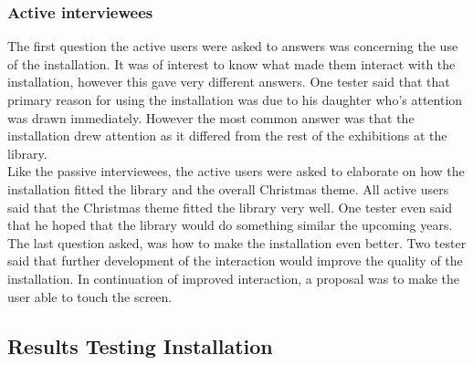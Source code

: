 
\subsubsection{Active interviewees}
The first question the active users were asked to answers was concerning the use of the installation. It was of interest to know what made them interact with the installation, however this gave very different answers. One tester said that that primary reason for using the installation was due to his daughter who's attention was drawn immediately. However the most common answer was that the installation drew attention as it differed from the rest of the exhibitions at the library.\\
Like the passive interviewees, the active users were asked to elaborate on how the installation fitted the library and the overall Christmas theme. All active users said that the Christmas theme fitted the library very well. One tester even said that he hoped that the library would do something similar the upcoming years.\\
The last question asked, was how to make the installation even better. Two tester said that further development of the interaction would improve the quality of the installation. In continuation of improved interaction, a proposal was to make the user able to touch the screen.

\subsection{Results Testing Installation}

